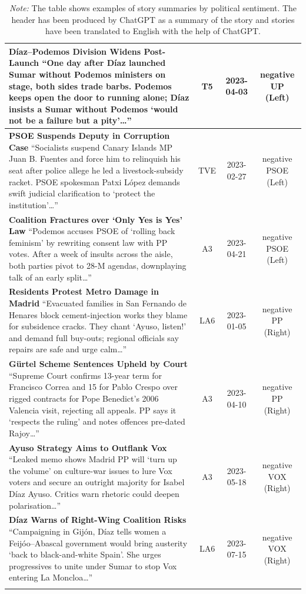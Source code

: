 \documentclass[12pt]{article}
\begin{document}
\begin{longtable}{|p{8cm}|c|c|c|}
	\hline
	\textbf{Díaz–Podemos Division Widens Post-Launch}\newline
	{\scriptsize
		“One day after Díaz launched Sumar without Podemos ministers on stage, both sides trade barbs.  
		Podemos keeps open the door to running alone; Díaz insists a Sumar without Podemos ‘would not be a failure but a pity’…”}
	& T5 & 2023-04-03 & negative UP (Left)\\
	\hline
	\textbf{PSOE Suspends Deputy in Corruption Case}\newline
	{\scriptsize
		“Socialists suspend Canary Islands MP Juan B. Fuentes and force him to relinquish his seat after police allege he led a livestock-subsidy racket.  
		PSOE spokesman Patxi López demands swift judicial clarification to ‘protect the institution’…”}
	& TVE & 2023-02-27 & negative PSOE (Left)\\
	\hline
	\textbf{Coalition Fractures over ‘Only Yes is Yes’ Law}\newline
	{\scriptsize
		“Podemos accuses PSOE of ‘rolling back feminism’ by rewriting consent law with PP votes.  
		After a week of insults across the aisle, both parties pivot to 28-M agendas, downplaying talk of an early split…”}
	& A3 & 2023-04-21 & negative PSOE (Left)\\
	\hline
	\textbf{Residents Protest Metro Damage in Madrid}\newline
	{\scriptsize
		“Evacuated families in San Fernando de Henares block cement-injection works they blame for subsidence cracks.  
		They chant ‘Ayuso, listen!’ and demand full buy-outs; regional officials say repairs are safe and urge calm…”}
	& LA6 & 2023-01-05 & negative PP (Right)\\
	\hline
	\textbf{Gürtel Scheme Sentences Upheld by Court}\newline
	{\scriptsize
		“Supreme Court confirms 13-year term for Francisco Correa and 15 for Pablo Crespo over rigged contracts for Pope Benedict’s 2006 Valencia visit, rejecting all appeals.  
		PP says it ‘respects the ruling’ and notes offences pre-dated Rajoy…”}
	& A3 & 2023-04-10 & negative PP (Right)\\
	\hline
	\textbf{Ayuso Strategy Aims to Outflank Vox}\newline
	{\scriptsize
		“Leaked memo shows Madrid PP will ‘turn up the volume’ on culture-war issues to lure Vox voters and secure an outright majority for Isabel Díaz Ayuso.  
		Critics warn rhetoric could deepen polarisation…”}
	& A3 & 2023-05-18 & negative VOX (Right)\\
	\hline
	\textbf{Díaz Warns of Right-Wing Coalition Risks}\newline
	{\scriptsize
		“Campaigning in Gijón, Díaz tells women a Feijóo–Abascal government would bring austerity ‘back to black-and-white Spain’.  
		She urges progressives to unite under Sumar to stop Vox entering La Moncloa…”}
	& LA6 & 2023-07-15 & negative VOX (Right)\\
	\hline
	\caption*{\textit{Note:}  The table shows examples of story summaries by political sentiment. The header has been produced by ChatGPT as a summary of the story and stories have been translated to English with the help of ChatGPT.}
\end{longtable}
\end{document}
